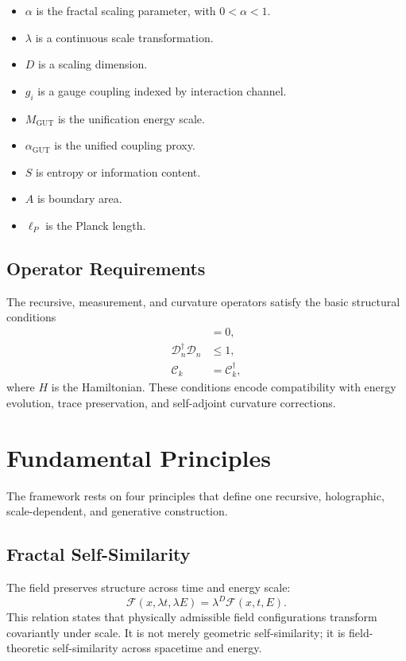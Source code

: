 \documentclass[12pt]{article}
\theoremstyle{remark}
\newcommand{\F}{\mathcal{F}}
\newcommand{\T}{\mathcal{T}}
\newcommand{\D}{\mathcal{D}}
\newcommand{\C}{\mathcal{C}}
\newcommand{\MGUT}{M_{\mathrm{GUT}}}
\newcommand{\aGUT}{\alpha_{\mathrm{GUT}}}
\begin{document}
\begin{itemize}
  \item $\alpha$ is the fractal scaling parameter, with $0<\alpha<1$.
  \item $\lambda$ is a continuous scale transformation.
  \item $D$ is a scaling dimension.
  \item $g_i$ is a gauge coupling indexed by interaction channel.
  \item $\MGUT$ is the unification energy scale.
  \item $\aGUT$ is the unified coupling proxy.
  \item $S$ is entropy or information content.
  \item $A$ is boundary area.
  \item $\ell_P$ is the Planck length.
\end{itemize}

\subsection{Operator Requirements}

The recursive, measurement, and curvature operators satisfy the basic structural
conditions
\begin{align}
  [\T,H] &= 0,\\
  \D_n^\dagger\D_n &\leq 1,\\
  \C_k &= \C_k^\dagger,
\end{align}
where $H$ is the Hamiltonian.  These conditions encode compatibility with
energy evolution, trace preservation, and self-adjoint curvature corrections.

\section{Fundamental Principles}

The framework rests on four principles that define one recursive,
holographic, scale-dependent, and generative construction.

\subsection{Fractal Self-Similarity}

The field preserves structure across time and energy scale:
\begin{equation}
  \F(x,\lambda t,\lambda E)=\lambda^D\F(x,t,E).
  \label{eq:fractal}
\end{equation}
This relation states that physically admissible field configurations transform
covariantly under scale.  It is not merely geometric self-similarity; it is
field-theoretic self-similarity across spacetime and energy.
\end{document}
